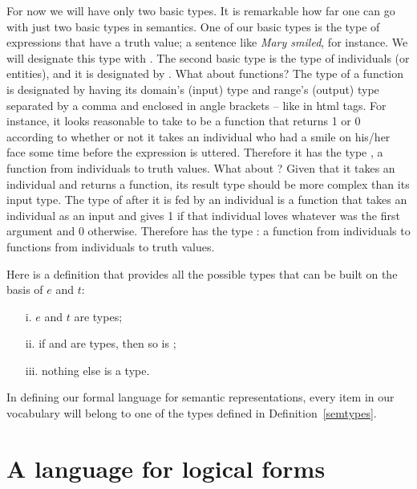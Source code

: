 \documentclass[11pt,a4paper,draft]{article}
\begin{document}
For now we will have only two basic types. It is remarkable how far one can go with just two basic types in semantics. One of our basic types is the type of expressions that have a truth value; a sentence like \emph{Mary smiled}, for instance. We will designate this type with . The second basic type is the type of individuals (or entities), and it is designated by . What about functions? The type of a function is designated by having its domain's (input) type and range's (output) type separated by a comma and enclosed in angle brackets -- like in html tags. For instance, it looks reasonable to take  to be a function that returns 1 or 0 according to whether or not it takes an individual who had a smile on his/her face some time before the expression is uttered. Therefore it has the type , a function from individuals to truth values. What about ? Given that it takes an individual and returns a function, its result type should be more complex than its input type. The type of  after it is fed by an individual is a function that takes an individual as an input and gives 1 if that individual loves whatever was the first argument and 0 otherwise. Therefore  has the type : a function from individuals to functions from individuals to truth values.

Here is a definition that provides all the possible types that can be built on the basis of $e$ and $t$:

\begin{udefinition}\label{semtypes}
\begin{enumerate}
\item[]
\item[i.] $e$ and $t$ are types; 
\item[ii.] if \sysm{\alpha} and \sysm{\beta} are types, then so is \smtyp{\alpha}{\beta}; 
\item[iii.]  nothing else is a type.
\end{enumerate}
\end{udefinition}

In defining our formal language for semantic representations, every item in our vocabulary will belong to one of the types defined in Definition~\ref{semtypes}.

\section{A language for logical forms}
\end{document}
